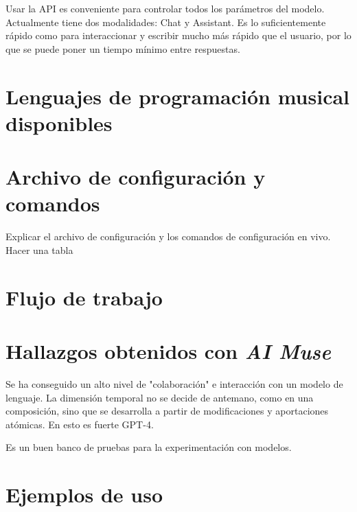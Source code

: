 Usar la API es conveniente para controlar todos los parámetros del modelo.
Actualmente tiene dos modalidades: Chat y Assistant.
Es lo suficientemente rápido como para interaccionar y escribir mucho más rápido que el usuario, por lo que se puede poner un tiempo mínimo entre respuestas.



\section{Lenguajes de programación musical disponibles}

\section{Archivo de configuración y comandos}

Explicar el archivo de configuración y los comandos de configuración en vivo. Hacer una tabla

\section{Flujo de trabajo}

\section{Hallazgos obtenidos con \emph{AI Muse}}

Se ha conseguido un alto nivel de "colaboración" e interacción con un modelo de lenguaje. La dimensión temporal no se decide de antemano, como en una composición, sino que se desarrolla a partir de modificaciones y aportaciones atómicas. En esto es fuerte GPT-4.

Es un buen banco de pruebas para la experimentación con modelos. 



\section{Ejemplos de uso}